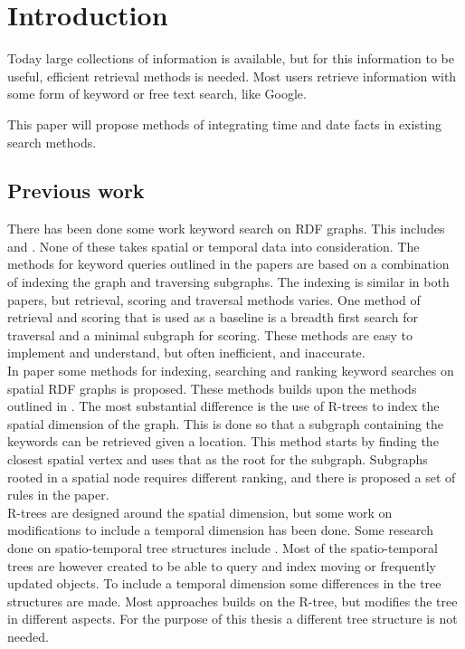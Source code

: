 
\chapter{Introduction}
Today large collections of information is available, but for this information to be useful, efficient retrieval methods is needed. Most users retrieve information with some form of keyword or free text search, like Google. 



This paper will propose methods of integrating time and date facts in existing search methods.  

\section{Previous work}
There has been done some work keyword search on RDF graphs. This includes \cite{4812421} and \cite{Elbassuoni:2011:KSO:2063576.2063615}. None of these takes spatial or temporal data into consideration. The methods for keyword queries outlined in the papers are based on a combination of indexing the graph and traversing subgraphs. The indexing is similar in both papers, but retrieval, scoring and traversal methods varies. One method of retrieval and scoring that is used as a baseline is a breadth first search for traversal and a minimal subgraph for scoring. These methods are easy to implement and understand, but often inefficient, and inaccurate.\\
In paper \cite{Shi:2016:TRS:2882903.2882941} some methods for indexing, searching and ranking keyword searches on spatial RDF graphs is proposed. These methods builds upon the methods outlined in \cite{4812421, Elbassuoni:2011:KSO:2063576.2063615}. The most substantial difference is the use of R-trees to index the spatial dimension of the graph. This is done so that a subgraph containing the keywords can be retrieved given a location. This method starts by finding the closest spatial vertex and uses that as the root for the subgraph. Subgraphs rooted in a spatial node requires different ranking, and there is proposed a set of rules in the paper.\\
R-trees are designed around the spatial dimension, but some work on modifications to include a temporal dimension has been done. Some research done on spatio-temporal tree structures include \cite{Tao:2003:TOS:1315451.1315519, r-tree-spatio-temporal}. Most of the spatio-temporal trees are however created to be able to query and index moving or frequently updated objects. To include a temporal dimension some differences in the tree structures are made. Most approaches builds on the R-tree, but modifies the tree in different aspects. For the purpose of this thesis a different tree structure is not needed.\\ %

